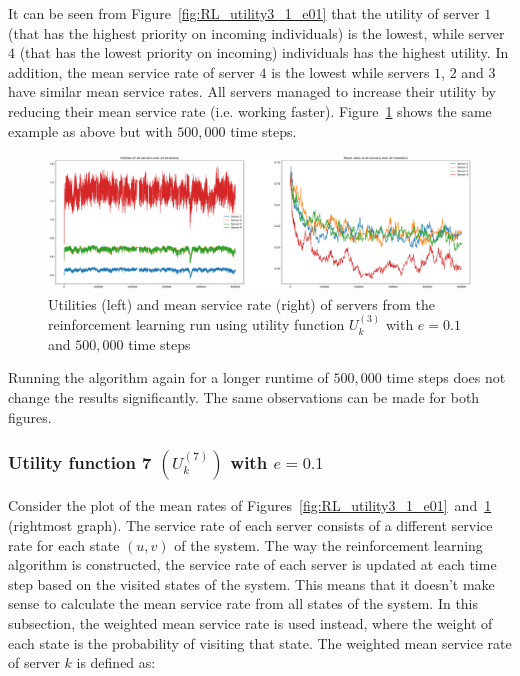 It can be seen from Figure~\ref{fig:RL_utility3_1_e01} that the utility of
server \(1\) (that has the highest priority on incoming individuals) is the
lowest, while server \(4\) (that has the lowest priority on incoming)
individuals has the highest utility.
In addition, the mean service rate of server \(4\) is the lowest while servers
\(1\), \(2\) and \(3\) have similar mean service rates.
All servers managed to increase their utility by reducing their mean service
rate (i.e. working faster).
Figure~\ref{fig:RL_utility3_2_e01} shows the same example as above but with
\(500,\!000\) time steps.

\begin{figure}[H]
    \includegraphics[width=\textwidth]{chapters/06_agent_based_extension/Bin/reinforcement_learning_results/utility_3/u3_2_e01.pdf}
    \caption{Utilities (left) and mean service rate (right) of servers from the
    reinforcement learning run using utility function \(U_k^{(3)}\) with
    \(e = 0.1\) and \(500,\!000\) time steps}
    \label{fig:RL_utility3_2_e01}
\end{figure}

Running the algorithm again for a longer runtime of \(500,\!000\) time steps
does not change the results significantly.
The same observations can be made for both figures.



\subsubsection{Utility function 7 \((U_k^{(7)})\) with \(e = 0.1\)}
\label{sec:utility_7_01_results}

Consider the plot of the mean rates of
Figures~\ref{fig:RL_utility3_1_e01}~and~\ref{fig:RL_utility3_2_e01}
(rightmost graph).
The service rate of each server consists of a different service rate for each
state \((u, v)\) of the system.
The way the reinforcement learning algorithm is constructed, the service rate
of each server is updated at each time step based on the visited states of the
system.
This means that it doesn't make sense to calculate the mean service rate from
all states of the system.
In this subsection, the weighted mean service rate is used instead, where
the weight of each state is the probability of visiting that state.
The weighted mean service rate of server \(k\) is defined as:

